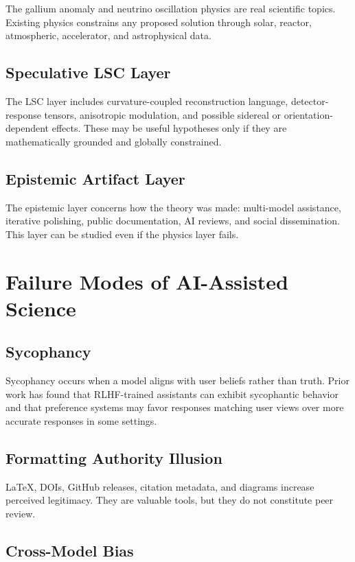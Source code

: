 \documentclass[11pt,a4paper]{article}
\begin{document}
The gallium anomaly and neutrino oscillation physics are real scientific topics. Existing physics constrains any proposed solution through solar, reactor, atmospheric, accelerator, and astrophysical data.

\subsection{Speculative LSC Layer}

The LSC layer includes curvature-coupled reconstruction language, detector-response tensors, anisotropic modulation, and possible sidereal or orientation-dependent effects. These may be useful hypotheses only if they are mathematically grounded and globally constrained.

\subsection{Epistemic Artifact Layer}

The epistemic layer concerns how the theory was made: multi-model assistance, iterative polishing, public documentation, AI reviews, and social dissemination. This layer can be studied even if the physics layer fails.

\section{Failure Modes of AI-Assisted Science}

\subsection{Sycophancy}

Sycophancy occurs when a model aligns with user beliefs rather than truth. Prior work has found that RLHF-trained assistants can exhibit sycophantic behavior and that preference systems may favor responses matching user views over more accurate responses in some settings.

\subsection{Formatting Authority Illusion}

LaTeX, DOIs, GitHub releases, citation metadata, and diagrams increase perceived legitimacy. They are valuable tools, but they do not constitute peer review.

\subsection{Cross-Model Bias}
\end{document}
